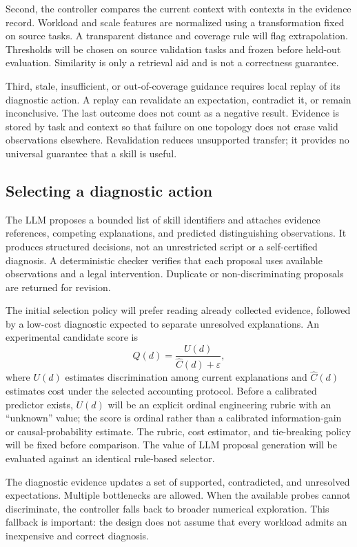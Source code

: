 \documentclass[preprint,12pt]{elsarticle}
\begin{document}
Second, the controller compares the current context with contexts in the evidence record. Workload and scale features are normalized using a transformation fixed on source tasks. A transparent distance and coverage rule will flag extrapolation. Thresholds will be chosen on source validation tasks and frozen before held-out evaluation. Similarity is only a retrieval aid and is not a correctness guarantee.

Third, stale, insufficient, or out-of-coverage guidance requires local replay of its diagnostic action. A replay can revalidate an expectation, contradict it, or remain inconclusive. The last outcome does not count as a negative result. Evidence is stored by task and context so that failure on one topology does not erase valid observations elsewhere. Revalidation reduces unsupported transfer; it provides no universal guarantee that a skill is useful.

\subsection{Selecting a diagnostic action}
The LLM proposes a bounded list of skill identifiers and attaches evidence references, competing explanations, and predicted distinguishing observations. It produces structured decisions, not an unrestricted script or a self-certified diagnosis. A deterministic checker verifies that each proposal uses available observations and a legal intervention. Duplicate or non-discriminating proposals are returned for revision.

The initial selection policy will prefer reading already collected evidence, followed by a low-cost diagnostic expected to separate unresolved explanations. An experimental candidate score is
\begin{equation}
 Q(d)=\frac{U(d)}{\widehat C(d)+\varepsilon},
\end{equation}
where $U(d)$ estimates discrimination among current explanations and $\widehat C(d)$ estimates cost under the selected accounting protocol. Before a calibrated predictor exists, $U(d)$ will be an explicit ordinal engineering rubric with an ``unknown'' value; the score is ordinal rather than a calibrated information-gain or causal-probability estimate. The rubric, cost estimator, and tie-breaking policy will be fixed before comparison. The value of LLM proposal generation will be evaluated against an identical rule-based selector.

The diagnostic evidence updates a set of supported, contradicted, and unresolved expectations. Multiple bottlenecks are allowed. When the available probes cannot discriminate, the controller falls back to broader numerical exploration. This fallback is important: the design does not assume that every workload admits an inexpensive and correct diagnosis.
\end{document}
